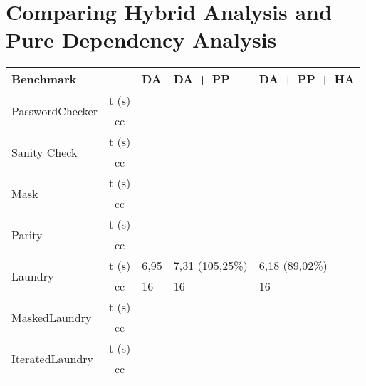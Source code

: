 \section{Comparing Hybrid Analysis and Pure Dependency Analysis}
\begin{center}
\begin{table}[]
    \begin{tabular}{|l|c|l|l|l|}
    \hline
    \textbf{Benchmark}               & \multicolumn{1}{l|}{}      & DA & DA + PP & DA + PP + HA \\ \hline
    \multirow{2}{*}{PasswordChecker} & \multicolumn{1}{l|}{t (s)} &    &         &               \\ \cline{2-5} 
                                     & cc                         &    &         &               \\ \hline
    \multirow{2}{*}{Sanity Check}    & \multicolumn{1}{l|}{t (s)} &    &         &               \\ \cline{2-5} 
                                     & cc                         &    &         &               \\ \hline
    \multirow{2}{*}{Mask}            & t (s)                      &    &         &               \\ \cline{2-5} 
                                     & cc                         &    &         &               \\ \hline
    \multirow{2}{*}{Parity}          & t (s)                      &    &         &               \\ \cline{2-5} 
                                     & cc                         &    &         &               \\ \hline
    \multirow{2}{*}{Laundry}         & t (s)                      &  6,95  &  7,31 (105,25\%) & 6,18 (89,02\%) \\ \cline{2-5} 
                                     & cc                         & 16 &    16     &    16           \\ \hline
    \multirow{2}{*}{MaskedLaundry}   & t (s)                      &    &         &               \\ \cline{2-5} 
                                     & cc                         &    &         &               \\ \hline
    \multirow{2}{*}{IteratedLaundry} & t (s)                      &    &         &               \\ \cline{2-5} 
                                     & cc                         &    &         &               \\ \hline

\end{tabular}
\end{table}
\end{center}
